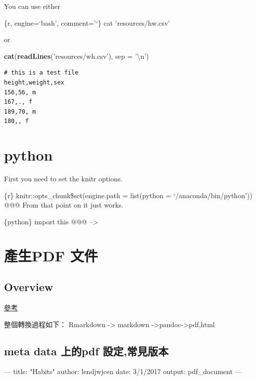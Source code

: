 \documentclass[]{book}
\newenvironment{Shaded}{\begin{snugshade}}{\end{snugshade}}
\newcommand{\AttributeTok}[1]{\textcolor[rgb]{0.77,0.63,0.00}{#1}}
\newcommand{\CharTok}[1]{\textcolor[rgb]{0.31,0.60,0.02}{#1}}
\newcommand{\DataTypeTok}[1]{\textcolor[rgb]{0.13,0.29,0.53}{#1}}
\newcommand{\FunctionTok}[1]{\textcolor[rgb]{0.00,0.00,0.00}{#1}}
\newcommand{\KeywordTok}[1]{\textcolor[rgb]{0.13,0.29,0.53}{\textbf{#1}}}
\newcommand{\NormalTok}[1]{#1}
\newcommand{\OtherTok}[1]{\textcolor[rgb]{0.56,0.35,0.01}{#1}}
\newcommand{\StringTok}[1]{\textcolor[rgb]{0.31,0.60,0.02}{#1}}
\theoremstyle{definition}
\theoremstyle{definition}
\theoremstyle{definition}
\theoremstyle{remark}
\begin{document}
You can use either

\{r, engine=`bash', comment='`\} cat 'resources/hw.csv'

or

\begin{Shaded}
\begin{Highlighting}[]
\KeywordTok{cat}\NormalTok{(}\KeywordTok{readLines}\NormalTok{(}\StringTok{'resources/wh.csv'}\NormalTok{), }\DataTypeTok{sep =} \StringTok{'}\CharTok{\textbackslash{}n}\StringTok{'}\NormalTok{)}
\end{Highlighting}
\end{Shaded}

\begin{verbatim}
# this is a test file
height,weight,sex
156,56, m
167,., f
189,70, m
180,, f
\end{verbatim}

\hypertarget{python}{%
\section{python}\label{python}}

First you need to set the knitr options.

\{r\} knitr::opts\_chunk\$set(engine.path = list(python =
`/anaconda/bin/python')) @@@ From that point on it just works.

\{python\} import this @@@ --\textgreater{}

\hypertarget{pdf-}{%
\section{產生PDF 文件}\label{pdf-}}

\hypertarget{overview}{%
\subsection{Overview}\label{overview}}

\href{https://rmarkdown.rstudio.com/pdf_document_format}{參考}

整個轉換過程如下： Rmarkdown -\textgreater{} markdown
-\textgreater{}pandoc-\textgreater{}pdf,html

\hypertarget{meta-data-pdf-}{%
\subsection{meta data 上的pdf 設定,常見版本}\label{meta-data-pdf-}}

\begin{Shaded}
\begin{Highlighting}[]
\OtherTok{---}
\FunctionTok{title:}\AttributeTok{ }\StringTok{"Habits"}
\FunctionTok{author:}\AttributeTok{ lendjwjcen }
\FunctionTok{date:}\AttributeTok{ 3/1/2017}
\FunctionTok{output:}\AttributeTok{ pdf_document}
\OtherTok{---}
\end{Highlighting}
\end{Shaded}
\end{document}
